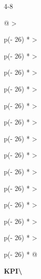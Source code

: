\begin{wptable}{4-8}\footnotesize

\begin{longtable}[]{@{}
  >{\raggedright\arraybackslash}p{(\columnwidth - 26\tabcolsep) * }
  >{\raggedright\arraybackslash}p{(\columnwidth - 26\tabcolsep) * }
  >{\raggedright\arraybackslash}p{(\columnwidth - 26\tabcolsep) * }
  >{\raggedright\arraybackslash}p{(\columnwidth - 26\tabcolsep) * }
  >{\raggedright\arraybackslash}p{(\columnwidth - 26\tabcolsep) * }
  >{\raggedright\arraybackslash}p{(\columnwidth - 26\tabcolsep) * }
  >{\raggedright\arraybackslash}p{(\columnwidth - 26\tabcolsep) * }
  >{\raggedright\arraybackslash}p{(\columnwidth - 26\tabcolsep) * }
  >{\raggedright\arraybackslash}p{(\columnwidth - 26\tabcolsep) * }
  >{\raggedright\arraybackslash}p{(\columnwidth - 26\tabcolsep) * }
  >{\raggedright\arraybackslash}p{(\columnwidth - 26\tabcolsep) * }
  >{\raggedright\arraybackslash}p{(\columnwidth - 26\tabcolsep) * }
  >{\raggedright\arraybackslash}p{(\columnwidth - 26\tabcolsep) * }
  >{\raggedright\arraybackslash}p{(\columnwidth - 26\tabcolsep) * }@{}}
\caption{Mapping of Monitoring System requirements onto the project
KPIs}\tabularnewline
\toprule\noalign{}
\begin{minipage}[b]{\linewidth}\raggedright
\textbf{KPI\textbackslash{}}


\end{minipage}
\end{longtable}
\end{wptable}
